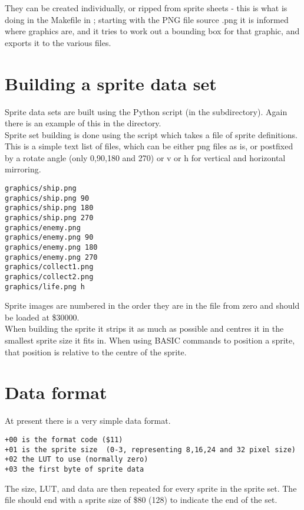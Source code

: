 They can be created individually, or ripped from sprite sheets - this is what  is doing in the Makefile in ; starting with the PNG file source .png it is informed where graphics are, and it tries to work out a bounding box for that graphic, and exports it to the various files.

\section{Building a sprite data set}

Sprite data sets are built using the  Python script (in the  subdirectory). Again there is an example of this in the  directory.\\

Sprite set building is done using the  script which takes a file of sprite definitions. This is a simple text list of files, which can be either png files as is, or postfixed by a rotate angle (only 0,90,180 and 270) or v or h for vertical and horizontal mirroring.

\begin{verbatim}
graphics/ship.png
graphics/ship.png 90
graphics/ship.png 180
graphics/ship.png 270
graphics/enemy.png
graphics/enemy.png 90
graphics/enemy.png 180
graphics/enemy.png 270
graphics/collect1.png
graphics/collect2.png
graphics/life.png h
\end{verbatim}

Sprite images are numbered in the order they are in the file from zero and should be loaded at \$30000.\\

When building the sprite it strips it as much as possible and centres it in the smallest sprite size it fits in. When using BASIC commands to position a sprite, that position is relative to the centre of the sprite.

\section{Data format}

At present there is a very simple data format.

\begin{verbatim}
+00 is the format code ($11)
+01 is the sprite size  (0-3, representing 8,16,24 and 32 pixel size)
+02 the LUT to use (normally zero)
+03 the first byte of sprite data
\end{verbatim}

The size, LUT, and data are then repeated for every sprite in the sprite set. The file should end with a sprite size of \$80 (128) to indicate the end of the set.

